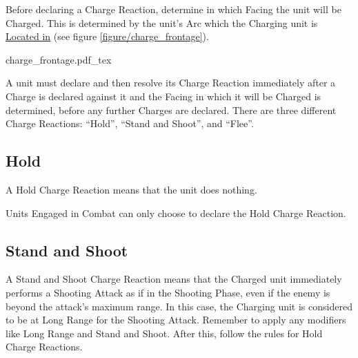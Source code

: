 Before declaring a Charge Reaction, determine in which Facing the unit will be Charged. This is determined by the unit's Arc which the Charging unit is \hyperref[unit_arcs]{Located in} (see figure \ref{figure/charge_frontage}).

\newcommand{\chargefrontageCharge}{\smallfontsize{\flufffont{Charge!}}}
\newcommand{\chargefrontageA}{a)}
\newcommand{\chargefrontageB}{b)}

\begin{Figure}
	\Fanchor
	\vspace{-5pt}
	\renewcommand{\figbiglettersize}{21}
	\def\svgwidth{\columnwidth}
	{charge_frontage.pdf_tex}
	\caption{Front or Flank?\captionposttitle
		a) The Charging unit is Located in the enemy's Front Arc (since this is where the centre of its Front Facing is).\captionpar
		b) The Charging unit must contact the Charged unit's Front Facing.%
	}
	\label{figure/charge_frontage}
\end{Figure}
	
A unit must declare and then resolve its Charge Reaction immediately after a Charge is declared against it and the Facing in which it will be Charged is determined, before any further Charges are declared. There are three different Charge Reactions: \enquote{Hold}, \enquote{Stand and Shoot}, and \enquote{Flee}.

\subsection{Hold}

A Hold Charge Reaction means that the unit does nothing.

Units Engaged in Combat can only choose to declare the Hold Charge Reaction.

\subsection{Stand and Shoot}

A Stand and Shoot Charge Reaction means that the Charged unit immediately performs a Shooting Attack as if in the Shooting Phase, even if the enemy is beyond the attack's maximum range. In this case, the Charging unit is considered to be at Long Range for the Shooting Attack. Remember to apply any modifiers like Long Range and Stand and Shoot. After this, follow the rules for Hold Charge Reactions.

